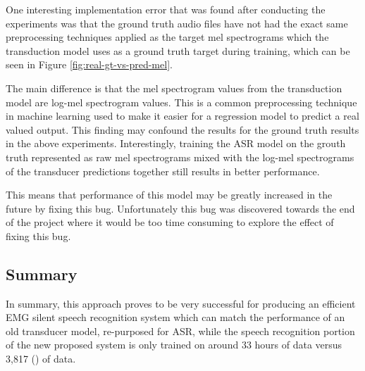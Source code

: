 One interesting implementation error that was found after conducting the experiments
was that the ground truth audio files have not had the exact same preprocessing techniques
applied as the target mel spectrograms which the transduction model uses as a ground truth
target during training, which can be seen in Figure \ref{fig:real-gt-vs-pred-mel}.

The main difference is that the mel spectrogram values from the transduction model are
log-mel spectrogram values. This is a common preprocessing technique in machine learning
used to make it easier for a regression model to predict a real valued output. This finding
may confound the results for the ground truth results in the above experiments. Interestingly,
training the ASR model on the grouth truth represented as raw mel spectrograms mixed
with the log-mel spectrograms of the transducer predictions together still results in better
performance.

This means that performance of this model may be greatly increased in the future by fixing
this bug. Unfortunately this bug was discovered towards the end of the project where it would
be too time consuming to explore the effect of fixing this bug.

\subsection{Summary}

In summary, this approach proves to be very successful for producing
an efficient EMG silent speech recognition system which can match the
performance of an old transducer model, re-purposed for ASR, while
the speech recognition portion of the new proposed system is only trained
on around 33 hours of data versus 3,817 (\cite{deepspeech0.7.0-training-ref}) of data.